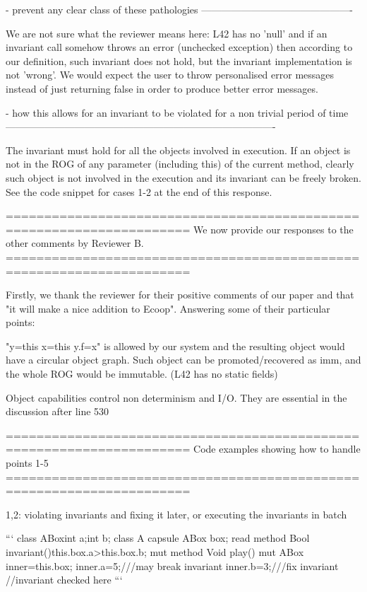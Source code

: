 - prevent any clear class of these pathologies
----------------------------------------------

We are not sure what the reviewer means here: L42 has no 'null' and if an invariant call
somehow throws an error (unchecked exception) then according to our definition,
such invariant does not hold, but the invariant implementation is not 'wrong'.
We would expect the user to throw personalised error messages instead of just returning false
in order to produce better error messages.

- how this allows for an invariant to be violated for a non trivial period of time
----------------------------------------------------------------------------------

The invariant must hold for all the objects involved in execution.
If an object is not in the ROG of any parameter (including this) of the current method,
clearly such object is not involved in the execution and its invariant can be freely broken.
See the code snippet for cases 1-2 at the end of this response.


======================================================================
We now provide our responses to the other comments by Reviewer B.
======================================================================

Firstly, we thank the reviewer for their positive comments of our paper and that "it will make a nice addition to Ecoop".
Answering some of their particular points: 

"y=this x=this y.f=x" is allowed by our system and the resulting object would have a circular object graph.
Such object can be promoted/recovered as imm, and the whole ROG would be immutable.
(L42 has no static fields)

Object capabilities control non determinism and I/O. They are essential in the discussion after line 530


======================================================================
Code examples showing how to handle points 1-5
======================================================================

1,2: violating invariants and fixing it later, or executing the invariants in batch

```
  class ABox{int a;int b;}
  class A{
   capsule ABox box;
   read method Bool invariant(){this.box.a>this.box.b;}
   mut method Void play(){
     mut ABox inner=this.box;
     inner.a=5;///may break invariant
     inner.b=3;///fix invariant
     //invariant checked here
     }}
```

